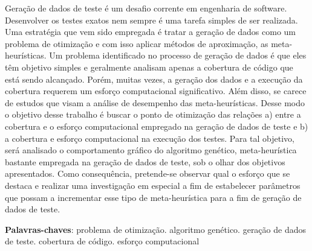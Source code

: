 \begin{resumo}
 
Geração de dados de teste é um desafio corrente em engenharia de software. Desenvolver os testes exatos nem sempre é uma tarefa simples de ser realizada. Uma estratégia que vem sido empregada é tratar a geração de dados como um problema de otimização e com isso aplicar métodos de aproximação, as meta-heurísticas. Um problema identificado no processo de geração de dados é que eles têm objetivo simples e geralmente analisam apenas a cobertura de código que está sendo alcançado. Porém, muitas vezes, a geração dos dados e a execução da cobertura requerem um esforço computacional significativo. Além disso, se carece de estudos que visam a análise de desempenho das meta-heurísticas. Desse modo o objetivo desse trabalho é buscar o ponto de otimização das relações a) entre a cobertura e o esforço computacional empregado na geração de dados de teste e b) a cobertura e esforço computacional na execução dos testes. Para tal objetivo, será analisado o comportamento gráfico do algoritmo genético, meta-heurística bastante empregada na geração de dados de teste, sob o olhar dos objetivos apresentados. Como consequência, pretende-se observar qual o esforço que se destaca e realizar uma investigação em especial a fim de estabelecer parâmetros que possam a incrementar esse tipo de meta-heurística para a fim de geração de dados de teste.

 \vspace{\onelineskip}
    
 \noindent
 \textbf{Palavras-chaves}: problema de otimização. algoritmo genético. geração de dados de teste. cobertura de código. esforço computacional
\end{resumo}
